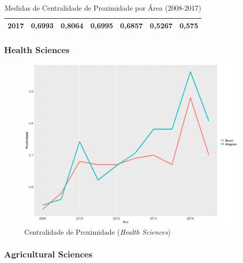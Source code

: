 \begin{table}[H]
\begin{tabular}{|c|l|l|l|l|l|l|}
		2017            & 0,6993                                                 & 0,8064                                                  & 0,6995                                                    & 0,6857                                                     & 0,5267                                                      & 0,575                                                       \\ \hline
	\end{tabular}
\caption{Medidas de Centralidade de Proximidade por Área (2008-2017)}
\label{closeness-tab}
\end{table}


\subsubsection{Health Sciences}

\begin{figure}[H]
	\centering
	\includegraphics[scale=0.4]{Imagens/graf-linha-closeness-br-al.pdf}
	\caption{Centralidade de Proximidade (\textit{Health Sciences})}
	\label{close-health}
\end{figure}

\subsubsection{Agricultural Sciences}

